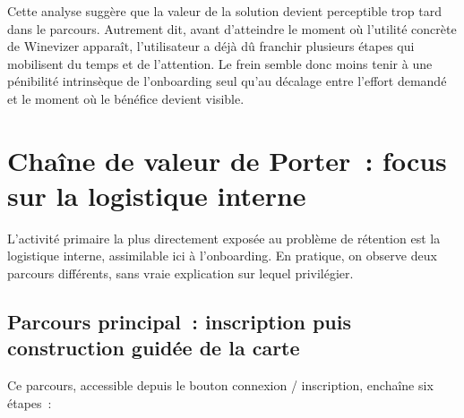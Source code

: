 \documentclass[12pt, a4paper]{article}
\begin{document}
Cette analyse suggère que la valeur de la solution devient perceptible trop tard
dans le parcours. Autrement dit, avant d'atteindre le moment où l'utilité concrète de
Winevizer apparaît, l'utilisateur a déjà dû franchir plusieurs étapes qui mobilisent du
temps et de l'attention. Le frein semble donc moins tenir à une pénibilité intrinsèque
de l'onboarding seul qu'au décalage entre l'effort demandé et le moment où le bénéfice
devient visible.

\section{Chaîne de valeur de Porter~: focus sur la logistique interne}
\label{sec:porter}

L'activité primaire la plus directement exposée au problème de rétention est la logistique
interne, assimilable ici à l'onboarding. En pratique,
on observe deux parcours différents, sans vraie explication sur lequel privilégier.

\subsection{Parcours principal~: inscription puis construction guidée de la carte}

Ce parcours, accessible depuis le bouton \og{}connexion / inscription\fg{}, enchaîne six
étapes~:
\end{document}

